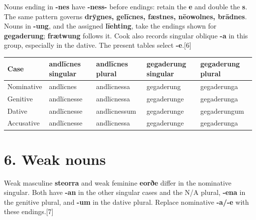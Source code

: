 Nouns ending in \textbf{-nes} have \textbf{-ness-} before endings: retain the \textbf{e} and double the \textbf{s}. The same pattern governs \textbf{drȳgnes, gelīcnes, fæstnes, nēowolnes, brādnes}. Nouns in \textbf{-ung}, and the assigned \textbf{līehting}, take the endings shown for \textbf{gegaderung}; \textbf{frætwung} follows it. Cook also records singular oblique \textbf{-a} in this group, especially in the dative. The present tables select \textbf{-e}.[6]

\par\begingroup
\fontsize{10.5}{13.2}\selectfont
\setlength{\LTleft}{0pt}\setlength{\LTright}{\fill}
\noindent
\begin{tabular}{@{}>{\raggedright\arraybackslash}p{19.0mm}>{\raggedright\arraybackslash}p{23.0mm}>{\raggedright\arraybackslash}p{23.0mm}>{\raggedright\arraybackslash}p{23.0mm}>{\raggedright\arraybackslash}p{24.752mm}@{}}
\toprule
\textbf{Case} & \textbf{andlīcnes singular} & \textbf{andlīcnes plural} & \textbf{gegaderung singular} & \textbf{gegaderung plural} \\
\midrule
Nominative & andlīcnes & andlīcnessa & gegaderung & gegaderunga \\
Genitive & andlīcnesse & andlīcnessa & gegaderunge & gegaderunga \\
Dative & andlīcnesse & andlīcnessum & gegaderunge & gegaderungum \\
Accusative & andlīcnesse & andlīcnessa & gegaderunge & gegaderunga \\
\bottomrule
\end{tabular}
\par\endgroup

\section*{6. Weak nouns}

Weak masculine \textbf{steorra} and weak feminine \textbf{eorðe} differ in the nominative singular. Both have \textbf{-an} in the other singular cases and the N/\allowbreak{}A plural, \textbf{-ena} in the genitive plural, and \textbf{-um} in the dative plural. Replace nominative \textbf{-a/\allowbreak{}-e} with these endings.[7]

